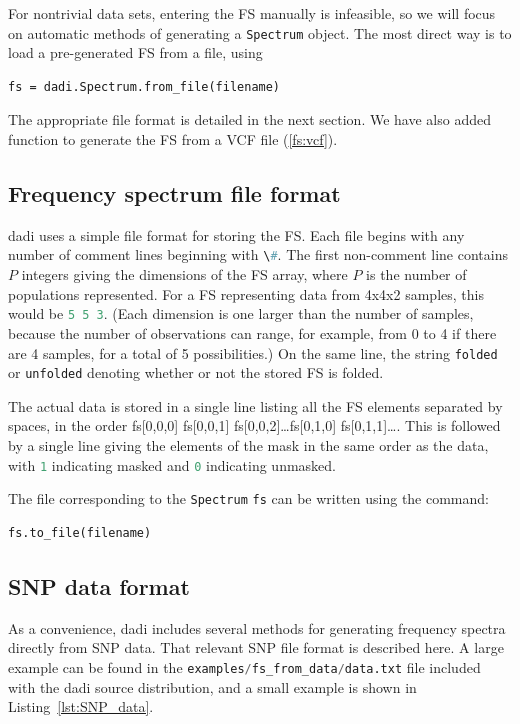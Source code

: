 \documentclass[12pt]{article}
\makeatletter
\newcommand{\dadi}{dadi\xspace}
\newcommand{\py}[1]{\lstinline[language=Python, showstringspaces=False]@#1@}
\makeatother
\begin{document}
For nontrivial data sets, entering the FS manually is infeasible, so we will focus on automatic methods of generating a \py{Spectrum} object.
The most direct way is to load a pre-generated FS from a file, using
\begin{lstlisting}
fs = dadi.Spectrum.from_file(filename)
\end{lstlisting}
The appropriate file format is detailed in the next section.
We have also added function to generate the FS from a VCF file (\ref{fs:vcf}).

\subsection{Frequency spectrum file format}

\dadi uses a simple file format for storing the FS.
Each file begins with any number of comment lines beginning with \py{\#}.
The first non-comment line contains $P$ integers giving the dimensions of the FS array, where $P$ is the number of populations represented.
For a FS representing data from 4x4x2 samples, this would be \py{5 5 3}.
(Each dimension is one larger than the number of samples, because the number of observations can range, for example, from 0 to 4 if there are 4 samples, for a total of 5 possibilities.)
On the same line, the string \py{folded} or \py{unfolded} denoting whether or not the stored FS is folded.

The actual data is stored in a single line listing all the FS elements separated by spaces, in the order fs[0,0,0] fs[0,0,1] fs[0,0,2]\dots fs[0,1,0] fs[0,1,1]\dots.
This is followed by a single line giving the elements of the mask in the same order as the data, with \py{1} indicating masked and \py{0} indicating unmasked.

The file corresponding to the \py{Spectrum} \py{fs} can be written using the command:
\begin{lstlisting}
fs.to_file(filename)
\end{lstlisting}

\subsection{SNP data format}

As a convenience, \dadi includes several methods for generating frequency spectra directly from SNP data.
That relevant SNP file format is described here.
A large example can be found in the \py{examples/fs_from_data/data.txt} file included with the \dadi source distribution, and a small example is shown in Listing~\ref{lst:SNP_data}.
\end{document}

